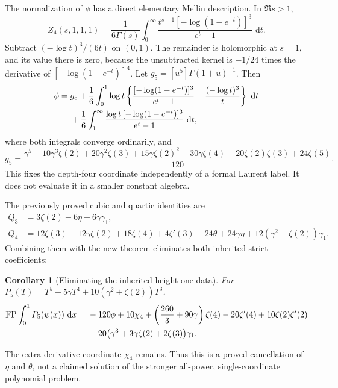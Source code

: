 \documentclass[11pt]{article}
\numberwithin{equation}{section}
\theoremstyle{plain}
\newtheorem{corollary}[theorem]{Corollary}
\theoremstyle{definition}
\theoremstyle{remark}
\DeclareMathOperator{\FP}{FP}
\newcommand{\dd}{\,\mathrm d}
\begin{document}
The normalization of $\phi$ has a direct elementary Mellin
description. In $\Re s>1$,
\begin{equation}\label{hp:heightMellin}
 Z_4(s,1,1,1)=\frac1{6\Gamma(s)}
   \int_0^\infty\frac{t^{s-1}[-\log(1-e^{-t})]^3}{e^t-1}\,\dd t.
\end{equation}
Subtract $(-\log t)^3/(6t)$ on $(0,1)$. The remainder is
holomorphic at $s=1$, and its value there is zero, because the
unsubtracted kernel is $-1/24$ times the derivative of
$[-\log(1-e^{-t})]^4$. Let $g_5=[u^5]\Gamma(1+u)^{-1}$.
Then
\begin{align}\label{hp:phiIntegral}
 \phi={}&g_5+\frac16\int_0^1\log t
  \left\{\frac{[-\log(1-e^{-t})]^3}{e^t-1}
                      -\frac{(-\log t)^3}{t}\right\}\,\dd t\notag\\
 &+\frac16\int_1^\infty
             \frac{\log t\,[-\log(1-e^{-t})]^3}{e^t-1}\,\dd t,
\end{align}
where both integrals converge ordinarily, and
\[
 g_5=\frac{\gamma^5-10\gamma^3\zeta(2)+20\gamma^2\zeta(3)
        +15\gamma\zeta(2)^2-30\gamma\zeta(4)
        -20\zeta(2)\zeta(3)+24\zeta(5)}{120}.
\]
This fixes the depth-four coordinate independently of a formal
Laurent label. It does not evaluate it in a smaller constant algebra.

The previously proved cubic and quartic identities\cite{repo:cubic,repo:quartic} are
\begin{align*}
 Q_3&=3\zeta(2)-6\eta-6\gamma\gamma_1,\\
 Q_4&=12\zeta(3)-12\gamma\zeta(2)+18\zeta(4)+4\zeta'(3)
       -24\theta+24\gamma\eta
       +12(\gamma^2-\zeta(2))\gamma_1.
\end{align*}
Combining them with the new theorem eliminates both inherited
strict coefficients:
\begin{corollary}[Eliminating the inherited height-one data]\label{hp:cancellation}
For $P_5(T)=T^5+5\gamma T^4+10(\gamma^2+\zeta(2))T^3$,
\begin{align}\label{hp:polyCancellation}
 \FP\int_0^1P_5(\psi(x))\,\dd x
 ={}&-120\phi+10\chi_4+
              \left(\frac{260}{3}+90\gamma\right)\zeta(4)
           -20\zeta'(4)+10\zeta(2)\zeta'(2)\notag\\
 &-20\bigl(\gamma^3+3\gamma\zeta(2)+2\zeta(3)\bigr)\gamma_1.
\end{align}
\end{corollary}
The extra derivative coordinate $\chi_4$ remains. Thus this is a
proved cancellation of $\eta$ and $\theta$, not a claimed solution
of the stronger all-power, single-coordinate polynomial problem.
\end{document}
